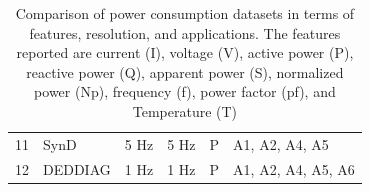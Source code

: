 \begin{table}
{\begin{tabular}{llccll}
            11                  & SynD                     & 5 Hz                           & 5 Hz                      & P                             & A1, A2, A4, A5         \\
            12                  & DEDDIAG                  & 1 Hz                           & 1 Hz                      & P                             & A1, A2, A4, A5, A6     \\ \bottomrule
        \end{tabular}}
    \caption[Comparison of power consumption datasets in terms of features, resolution, and applications]{Comparison of power consumption datasets in terms of features, resolution, and applications. The features reported are current (I), voltage (V), active power (P), reactive power (Q), apparent power (S), normalized power (Np), frequency (f), power factor (pf), and Temperature (T)}%
    \label{tab:datasets_applications}
\end{table}